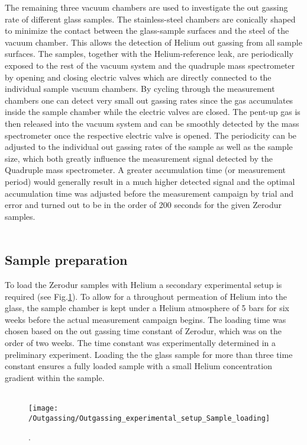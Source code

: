 The remaining three vacuum chambers are used to investigate the out gassing rate of different glass samples. The stainless-steel chambers are conically shaped to minimize the contact between the glass-sample surfaces and the steel of the vacuum chamber. This allows the detection of Helium out gassing from all sample surfaces. The samples, together with the Helium-reference leak, are periodically exposed to the rest of the vacuum system and the quadruple mass spectrometer by opening and closing electric valves which are directly connected to the individual sample vacuum chambers. By cycling through the measurement chambers one can detect very small out gassing rates since the gas accumulates inside the sample chamber while the electric valves are closed. The pent-up gas is then released into the vacuum system and can be smoothly detected by the mass spectrometer once the respective electric valve is opened. The periodicity can be adjusted to the individual out gassing rates of the sample as well as the sample size, which both greatly influence the measurement signal detected by the Quadruple mass spectrometer. A greater accumulation time (or measurement period) would generally result in a much higher detected signal and the optimal accumulation time was adjusted before the measurement campaign by trial and error and turned out to be in the order of 200 seconds for the given Zerodur samples.\\\\
\noindent

\subsection{Sample preparation}
To load the Zerodur samples with Helium a secondary experimental setup is required (see Fig.\ref{fig:outgassing_exp_setup_for_loading}). To allow for a throughout permeation of Helium into the glass, the sample chamber is kept under a Helium atmosphere of 5 bars for six weeks before the actual measurement campaign begins. The loading time was chosen based on the out gassing time constant of Zerodur, which was on the order of two weeks. The time constant was experimentally determined in a preliminary experiment. Loading the the glass sample for more than three time constant ensures a fully loaded sample with a small Helium concentration gradient within the sample. \\ \\
\noindent
\begin{figure}[H]
	\centering
	\texttt{[image: /Outgassing/Outgassing\_experimental\_setup\_Sample\_loading]}
	\caption{.}
	\label{fig:outgassing_exp_setup_for_loading}
\end{figure}

